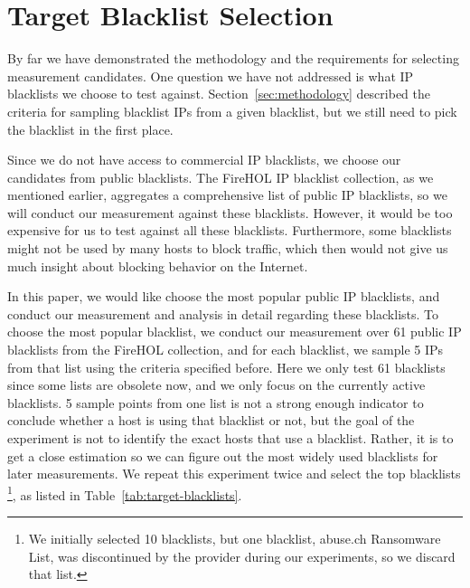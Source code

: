 \section{Target Blacklist Selection}

By far we have demonstrated the methodology and the requirements for selecting
measurement candidates. One question we have not addressed is what IP blacklists
we choose to test against. Section~\ref{sec:methodology} described the criteria
for sampling blacklist IPs from a given blacklist, but we still need to pick
the blacklist in the first place.

Since we do not have access to commercial IP blacklists, we choose our
candidates from public blacklists. The FireHOL IP blacklist collection, as we
mentioned earlier, aggregates a comprehensive list of public IP blacklists, so
we will conduct our measurement against these blacklists. However, it would be
too expensive for us to test against all these blacklists. Furthermore, some
blacklists might not be used by many hosts to block traffic, which then would
not give us much insight about blocking behavior on the Internet.

In this paper, we would like choose the most popular public IP blacklists,
and conduct our measurement and analysis in detail regarding these
blacklists. To choose the most popular blacklist, we conduct our measurement
over 61 public IP blacklists from the FireHOL collection, and for each
blacklist, we sample 5 IPs from that list using the criteria specified
before. Here we only test 61 blacklists since some lists are obsolete now,
and we only focus on the currently active blacklists. 5 sample points from
one list is not a strong enough indicator to conclude whether a host is using
that blacklist or not, but the goal of the experiment is not to identify the
exact hosts that use a blacklist. Rather, it is to get a close estimation so
we can figure out the most widely used blacklists for later measurements. We
repeat this experiment twice and select the top {\blacklistnum} blacklists
\footnote{We initially selected 10 blacklists, but one blacklist, abuse.ch
Ransomware List, was discontinued by the provider during our experiments, so
we discard that list.}, as listed in Table~\ref{tab:target-blacklists}.

